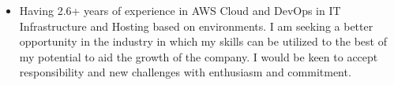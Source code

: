 \documentclass[10pt,a4paper,ragged2e,withhyper]{altacv}
\begin{document}
\newenvironment{sloppypar*}{\sloppy\ignorespaces}{\par}


\makecvheader

\begin{itemize}
    \item \normalsize{Having 2.6+ years of experience in AWS Cloud and DevOps in IT Infrastructure and Hosting based on environments. I am seeking a better opportunity in the industry in which my skills can be utilized to the best of my potential to aid the growth of the company. I would be keen to accept responsibility and new challenges with enthusiasm and commitment.}
\end{itemize}
\end{document}
